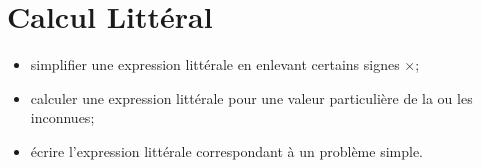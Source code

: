 \chapter{Calcul Littéral}\label{ChCalculLitteral}

\vspace{5cm}
\begin{acquis}
\begin{itemize}
\item simplifier une expression littérale en enlevant certains signes $\times$;
\item calculer une expression littérale pour une valeur particulière de la ou les inconnues;
\item écrire l'expression littérale correspondant à un problème simple.
\end{itemize}
\end{acquis}

\activites




\exercicesbase
\begin{colonne*exercice}

\end{colonne*exercice}


\exercicesappr
\begin{colonne*exercice}

\end{colonne*exercice}

\connaissances


\TravauxPratiques %


\pagebreak

\recreation



